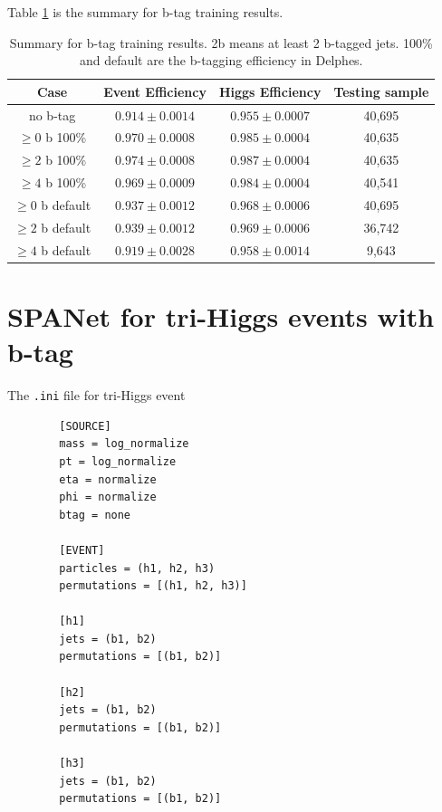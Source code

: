 \documentclass[12pt]{article}
\begin{document}
		Table \ref{tab:comparision_btag_results} is the summary for b-tag training results.
		\begin{table}[htpb]
			\centering
			\caption{Summary for b-tag training results. 2b means at least 2 b-tagged jets. 100\% and default are the b-tagging efficiency in Delphes.}
			\label{tab:comparision_btag_results}
			\begin{tabular}{c|cc|c}
				Case & Event Efficiency & Higgs Efficiency & Testing sample \\
				\hline
				no b-tag	         &  $0.914 \pm 0.0014$   &  $0.955 \pm 0.0007$  &  40,695	\\
				$\ge 0$ b 100\%	     &  $0.970 \pm 0.0008$   &  $0.985 \pm 0.0004$  &  40,635	\\
				$\ge 2$ b 100\%	     &  $0.974 \pm 0.0008$   &  $0.987 \pm 0.0004$  &  40,635	\\
				$\ge 4$ b 100\%	     &  $0.969 \pm 0.0009$   &  $0.984 \pm 0.0004$  &  40,541	\\
				$\ge 0$ b default	 &  $0.937 \pm 0.0012$   &  $0.968 \pm 0.0006$  &  40,695	\\
				$\ge 2$ b default	 &  $0.939 \pm 0.0012$   &  $0.969 \pm 0.0006$  &  36,742	\\
				$\ge 4$ b default	 &  $0.919 \pm 0.0028$   &  $0.958 \pm 0.0014$  &  9,643	\\
			\end{tabular}
		\end{table}



\section{SPANet for tri-Higgs events with b-tag}%
\label{sec:spanet_for_tri_higgs_events_with_b_tag}
	The \verb+.ini+ file for tri-Higgs event
	\begin{verbatim}
		[SOURCE]
		mass = log_normalize
		pt = log_normalize
		eta = normalize
		phi = normalize
		btag = none

		[EVENT]
		particles = (h1, h2, h3)
		permutations = [(h1, h2, h3)]

		[h1]
		jets = (b1, b2)
		permutations = [(b1, b2)]

		[h2]
		jets = (b1, b2)
		permutations = [(b1, b2)]

		[h3]
		jets = (b1, b2)
		permutations = [(b1, b2)]		
	\end{verbatim}
\end{document}
